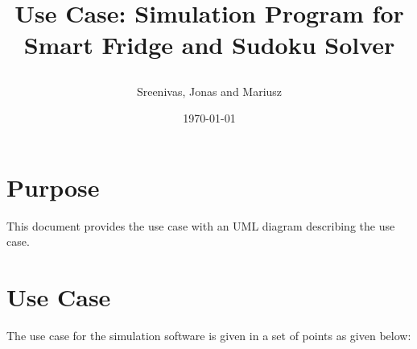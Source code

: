 \documentclass[a4paper,12pt]{article}
\begin{document}



\title{\begin{Huge}
\textbf{Use Case: Simulation Program for Smart Fridge and Sudoku Solver}
\end{Huge}}
\author{\begin{Large}
Sreenivas, Jonas and Mariusz
\end{Large}}
\date{\today}
\maketitle
\thispagestyle{empty}

\newpage

\section{Purpose}
This document provides the use case with an UML diagram describing the use case.

\section{Use Case}
The use case for the simulation software is given in a set of points as given below:
\end{document}
